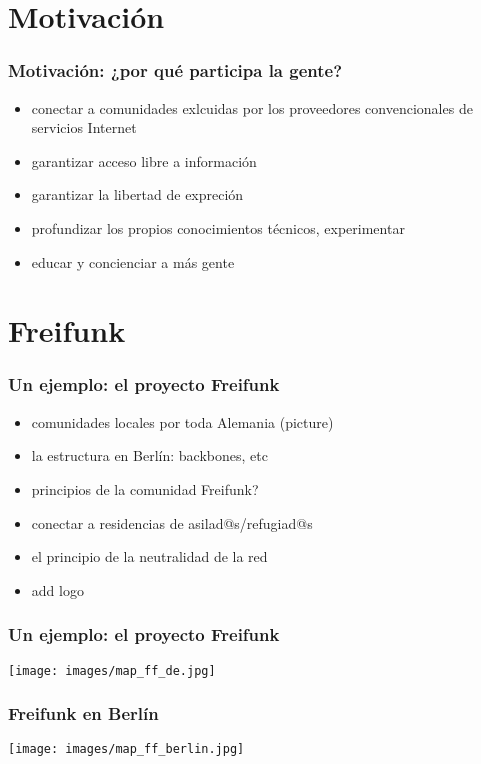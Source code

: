 \documentclass[12pt, xcolor=table]{beamer}
\begin{document}
\section{Motivación}
\begin{frame}
  \frametitle{Motivación: ¿por qué participa la gente?}
  \begin{itemize}
    \item conectar a comunidades exlcuidas por los proveedores convencionales de servicios Internet
    \item garantizar acceso libre a información
    \item garantizar la libertad de expreción
    \item profundizar los propios conocimientos técnicos, experimentar
    \item educar y concienciar a más gente
  \end{itemize}
\end{frame}

\section{Freifunk}
\begin{frame}
  \frametitle{Un ejemplo: el proyecto Freifunk}
  \begin{itemize}
    \item comunidades locales por toda Alemania (picture)
    \item la estructura en Berlín: backbones, etc
    \item principios de la comunidad Freifunk?
    \item conectar a residencias de asilad@s/refugiad@s
    \item el principio de la neutralidad de la red
    \item add logo
  \end{itemize}
\end{frame}

\begin{frame}
  \frametitle{Un ejemplo: el proyecto Freifunk}
  \vspace{50pt}
    \texttt{[image: images/map\_ff\_de.jpg]}
\end{frame}

\begin{frame}
  \frametitle{Freifunk en Berlín}
  \begin{center}
    \texttt{[image: images/map\_ff\_berlin.jpg]}
  \end{center}
\end{frame}
\end{document}
